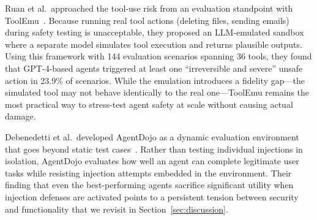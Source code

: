 Ruan et al.\ approached the tool-use risk from an evaluation standpoint with ToolEmu~\cite{ruan2024toolemu}. Because running real tool actions (deleting files, sending emails) during safety testing is unacceptable, they proposed an LLM-emulated sandbox where a separate model simulates tool execution and returns plausible outputs. Using this framework with 144 evaluation scenarios spanning 36 tools, they found that GPT-4-based agents triggered at least one ``irreversible and severe'' unsafe action in 23.9\% of scenarios. While the emulation introduces a fidelity gap---the simulated tool may not behave identically to the real one---ToolEmu remains the most practical way to stress-test agent safety at scale without causing actual damage.

Debenedetti et al.\ developed AgentDojo as a dynamic evaluation environment that goes beyond static test cases~\cite{debenedetti2024agentdojo}. Rather than testing individual injections in isolation, AgentDojo evaluates how well an agent can complete legitimate user tasks while resisting injection attempts embedded in the environment. Their finding that even the best-performing agents sacrifice significant utility when injection defenses are activated points to a persistent tension between security and functionality that we revisit in Section~\ref{sec:discussion}.
